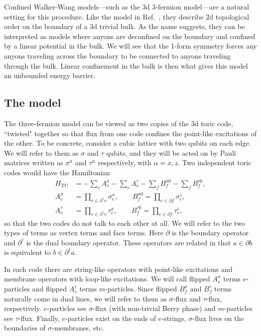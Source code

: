 \documentclass[twocolumn, longbibliography]{revtex4-2}
\newcommand{\TC}{\text{TC}}
\newcommand{\nn}{\nonumber\\}
\newcommand{\pardag}{\partial^\dagger\!}
\begin{document}
Confined Walker-Wang models---such as the 3d 3-fermion model---are a natural setting for this procedure. Like the model in Ref.~\cite{RobertsBartlett}, they describe 2d topological order on the boundary of a 3d trivial bulk. As the name suggests, they can be interpreted as models where anyons are deconfined on the boundary and confined by a linear potential in the bulk. We will see that the 1-form symmetry forces any anyons traveling across the boundary to be connected to anyons traveling through the bulk. Linear confinement in the bulk is then what gives this model an unbounded energy barrier.

\subsection{The model}

The three-fermion model can be viewed as two copies of the 3d toric code, ``twisted" together so that flux from one code confines the point-like excitations of the other. To be concrete, consider a cubic lattice with two qubits on each edge. We will refer to them as $\sigma$ and $\tau$ qubits, and they will be acted on by Pauli matrices written as $\sigma^\alpha$ and $\tau^\alpha$ respectively, with $\alpha = x,z$. Two independent toric codes would have the Hamiltonian 
\begin{align}
H_{\TC} &= -\sum_vA_v^{\sigma}-\sum_vA_v^{\tau}-\sum_fB_f^{\sigma0}-\sum_fB_f^{\tau0},\nn
A_v^{\sigma} &= \prod_{e\in \pardag v}\sigma_e^x, \qquad B_f^{\sigma0} = \prod_{e\in\partial f}\sigma_e^z,\nn
A_v^{\tau} &= \prod_{e\in \pardag v}\tau_e^x, \qquad B_f^{\tau0} = \prod_{e\in\partial f}\tau_e^z, \label{eqn:toric}
\end{align}
so that the two codes do not talk to each other at all. We will refer to the two types of terms as vertex terms and face terms. Here $\partial$ is the boundary operator and $\pardag$ is the dual boundary operator. These operators are related in that $a\in\partial b$ is equivalent to $b\in\pardag a$.

In each code there are string-like operators with point-like excitations and membrane operators with loop-like excitations. We will call flipped $A_v^\sigma$ terms $e$-particles and flipped $A_v^\tau$ terms $m$-particles. Since flipped $B_f^\sigma$ and $B_f^\tau$ terms naturally come in dual lines, we will refer to them as $\sigma$-flux and $\tau$-flux, respectively. $e$-particles see $\sigma$-flux (with non-trivial Berry phase) and $m$-particles see $\tau$-flux. Finally, $e$-particles exist on the ends of $e$-strings, $\sigma$-flux lives on the boundaries of $\sigma$-membranes, etc.
\end{document}

